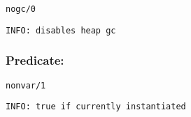 \begin{verbatim}
nogc/0
\end{verbatim}

{\small \begin{verbatim}
INFO: disables heap gc

\end{verbatim}}

\subsubsection{Predicate:} \label{nonvarV95W1}

\begin{verbatim}
nonvar/1
\end{verbatim}

{\small \begin{verbatim}
INFO: true if currently instantiated

\end{verbatim}}

